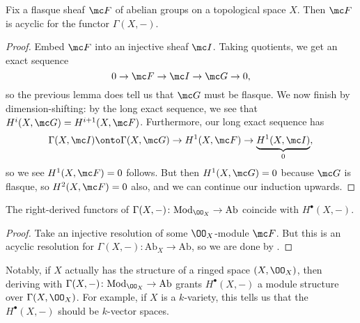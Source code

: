 \documentclass[../notes.tex]{subfiles}
\begin{document}
\begin{proposition}
	Fix a flasque sheaf $\mc F$ of abelian groups on a topological space $X$. Then $\mc F$ is acyclic for the functor $\Gamma(X,-)$.
\end{proposition}
\begin{proof}
	Embed $\mc F$ into an injective sheaf $\mc I$. Taking quotients, we get an exact sequence
	\[0\to\mc F\to\mc I\to\mc G\to0,\]
	so the previous lemma does tell us that $\mc G$ must be flasque. We now finish by dimension-shifting: by the long exact sequence, we see that $H^i(X,\mc G)=H^{i+1}(X,\mc F)$. Furthermore, our long exact sequence has
	\[\Gamma(X,\mc I)\onto\Gamma(X,\mc G)\to H^1(X,\mc F)\to\underbrace{H^1(X,\mc I)}_0,\]
	so we see $H^1(X,\mc F)=0$ follows. But then $H^1(X,\mc G)=0$ because $\mc G$ is flasque, so $H^2(X,\mc F)=0$ also, and we can continue our induction upwards.
\end{proof}
\begin{corollary}
	The right-derived functors of $\Gamma(X,-)\colon\mathrm{Mod}_{\OO_X}\to\mathrm{Ab}$ coincide with $H^\bullet(X,-)$.
\end{corollary}
\begin{proof}
	Take an injective resolution of some $\OO_X$-module $\mc F$. But this is an acyclic resolution for $\Gamma(X,-)\colon\mathrm{Ab}_X\to\mathrm{Ab}$, so we are done by .
\end{proof}
\begin{remark}
	Notably, if $X$ actually has the structure of a ringed space $(X,\OO_X)$, then deriving with $\Gamma(X,-)\colon\mathrm{Mod}_{\OO_X}\to\mathrm{Ab}$ grants $H^\bullet(X,-)$ a module structure over $\Gamma(X,\OO_X)$. For example, if $X$ is a $k$-variety, this tells us that the $H^\bullet(X,-)$ should be $k$-vector spaces.
\end{remark}
\end{document}

